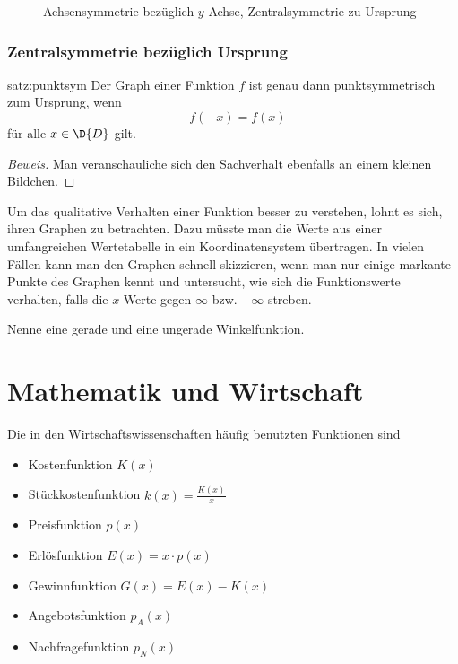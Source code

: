 \documentclass[%
11pt,%
twoside,%
titlepage,%
german,%
headsepline%
]{scrartcl}
\begin{document}
\begin{figure}[h!]
\caption{Achsensymmetrie bez\"uglich $y$-Achse, Zentralsymmetrie zu Ursprung}
\end{figure}

\subsubsection{Zentralsymmetrie bez\"uglich Ursprung}
\begin{csatz}{satz:punktsym}
Der Graph einer Funktion $f$ ist genau dann punktsymmetrisch zum Ursprung, wenn
$$-f(-x) = f(x)$$
f\"ur alle $x\in\D{D}$ gilt.
\end{csatz}
\begin{proof}[Beweis]
Man veranschauliche sich den Sachverhalt ebenfalls an einem kleinen Bildchen.
\end{proof}

Um das qualitative Verhalten einer Funktion besser zu verstehen, lohnt es sich, ihren Graphen zu betrachten. Dazu m\"usste man die Werte aus einer umfangreichen Wertetabelle in ein Koordinatensystem \"ubertragen. In vielen F\"allen kann man den Graphen schnell skizzieren, wenn man nur einige markante Punkte des Graphen kennt und untersucht, wie sich die Funktionswerte verhalten, falls die $x$-Werte gegen $\infty$ bzw. $-\infty$ streben.

\begin{ueb}
Nenne eine gerade und eine ungerade Winkelfunktion.
\end{ueb}

\newpage

\section{Mathematik und Wirtschaft}
Die in den Wirtschaftswissenschaften h\"aufig benutzten Funktionen sind
\begin{itemize}
\item Kostenfunktion $K(x)$
\item St\"uckkostenfunktion $k(x)=\frac{K(x)}{x}$
\item Preisfunktion $p(x)$
\item Erl\"osfunktion $E(x)=x\cdot p(x)$
\item Gewinnfunktion $G(x)=E(x)-K(x)$
\item Angebotsfunktion $p_A(x)$
\item Nachfragefunktion $p_N(x)$
\end{itemize}
\end{document}
